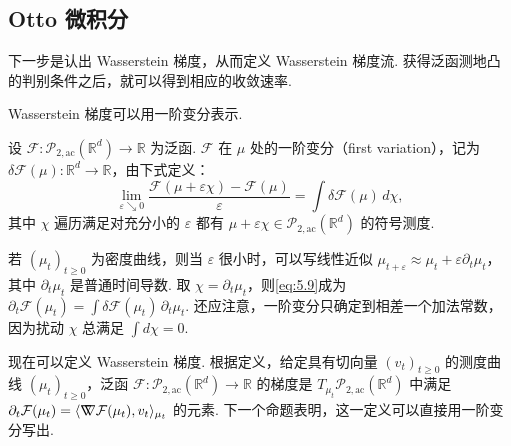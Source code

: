 \subsection{Otto 微积分}\label{sec:5.4}

下一步是认出 Wasserstein 梯度，从而定义 Wasserstein 梯度流. 获得泛函测地凸的判别条件之后，就可以得到相应的收敛速率.

Wasserstein 梯度可以用一阶变分表示.

\begin{definition}[一阶变分]\label{def:5.9}
设 $\mathcal F:\mathcal P_{2,\mathrm{ac}}(\mathbb R^d)\to\mathbb R$ 为泛函. $\mathcal F$ 在 $\mu$ 处的一阶变分（first variation），记为 $\delta\mathcal F(\mu):\mathbb R^d\to\mathbb R$，由下式定义：
\begin{equation}\label{eq:5.9}
\lim_{\varepsilon\searrow0}\frac{\mathcal F(\mu+\varepsilon\chi)-\mathcal F(\mu)}{\varepsilon}
=\int\delta\mathcal F(\mu)\,d\chi,
\end{equation}
其中 $\chi$ 遍历满足对充分小的 $\varepsilon$ 都有 $\mu+\varepsilon\chi\in\mathcal P_{2,\mathrm{ac}}(\mathbb R^d)$ 的符号测度.
\end{definition}

若 $(\mu_t)_{t\geq0}$ 为密度曲线，则当 $\varepsilon$ 很小时，可以写线性近似 $\mu_{t+\varepsilon}\approx\mu_t+\varepsilon\partial_t\mu_t$，其中 $\partial_t\mu_t$ 是普通时间导数. 取 $\chi=\partial_t\mu_t$，则\eqref{eq:5.9}成为 $\partial_t\mathcal F(\mu_t)=\int\delta\mathcal F(\mu_t)\,\partial_t\mu_t$. 还应注意，一阶变分只确定到相差一个加法常数，因为扰动 $\chi$ 总满足 $\int d\chi=0$.

现在可以定义 Wasserstein 梯度. 根据定义，给定具有切向量 $(v_t)_{t\geq0}$ 的测度曲线 $(\mu_t)_{t\geq0}$，泛函 $\mathcal F:\mathcal P_{2,\mathrm{ac}}(\mathbb R^d)\to\mathbb R$ 的梯度是 $T_{\mu_t}\mathcal P_{2,\mathrm{ac}}(\mathbb R^d)$ 中满足 $\partial_t\mathcal F(\mu_t)=\langle\nabla\mkern-10mu\nabla\mathcal F(\mu_t),v_t\rangle_{\mu_t}$ 的元素. 下一个命题表明，这一定义可以直接用一阶变分写出.

